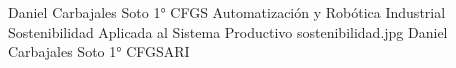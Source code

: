 \documentclass[spanish,openany]{report}
\date{\today}
\begin{document}
{Daniel Carbajales Soto}
{ 1° CFGS Automatización y Robótica Industrial\\
	Sostenibilidad Aplicada al Sistema Productivo}
{sostenibilidad.jpg}
\maketoc
{}
{Daniel Carbajales Soto}
{1° CFGSARI}
%
%
%



\setcounter{chapter}{1}

\newpage

\newpage


\end{document}
